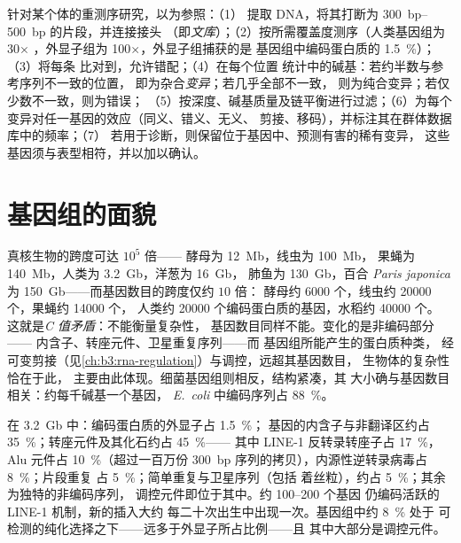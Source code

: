 \begin{method}[从样本到变异]\label{met:b3:genomics:pipeline}
针对某个体的重测序研究，以为参照：（1）
提取 DNA，将其打断为 \qtyrange{300}{500}{bp} 的片段，并连接接头
（即\emph{文库}）；（2）按所需覆盖度测序（人类基因组为 30$\times$
，外显子组为 100$\times$，外显子组捕获的是
基因组中编码蛋白质的 \qty{1.5}{\%}）；（3）将每条
比对到，允许错配；（4）在每个位置
统计中的碱基：若约半数与参考序列不一致的位置，
即为杂合\emph{变异}；若几乎全部不一致，
则为纯合变异；若仅少数不一致，则为错误；
（5）按深度、碱基质量及链平衡进行过滤；（6）为每个
变异对任一基因的效应（同义、错义、无义、
剪接、移码），并标注其在群体数据库中的频率；（7）
若用于诊断，则保留位于基因中、预测有害的稀有变异，
这些基因须与表型相符，并以加以确认。
\end{method}

\section{基因组的面貌}

\begin{proposition}[基因组大小与基因数目]\label{prop:b3:genomics:sizes}
真核生物的跨度可达 $10^{5}$ 倍——
酵母为 \qty{12}{Mb}，线虫为 \qty{100}{Mb}，
果蝇为 \qty{140}{Mb}，人类为 \qty{3.2}{Gb}，洋葱为 \qty{16}{Gb}，
肺鱼为 \qty{130}{Gb}，百合 \emph{Paris
japonica} 为 \qty{150}{Gb}——而基因数目的跨度仅约 $10$ 倍：
酵母约 \num{6000} 个，线虫约 \num{20000} 个，果蝇约 \num{14000} 个，
人类约 \num{20000} 个编码蛋白质的基因，水稻约 \num{40000} 个。
这就是\emph{C 值矛盾}：不能衡量复杂性，
基因数目同样不能。变化的是非编码部分——
内含子、转座元件、卫星重复序列——而
基因组所能产生的蛋白质种类，
经可变剪接（见\cref{ch:b3:rna-regulation}）与调控，远超其基因数目，
生物体的复杂性恰在于此，
主要由此体现。细菌基因组则相反，结构紧凑，其
大小确与基因数目相关：约每千碱基一个基因，
\emph{E.~coli} 中编码序列占 \qty{88}{\%}。
\end{proposition}

\begin{example}[按内容划分的人类基因组]\label{ex:b3:genomics:content}
在 \qty{3.2}{Gb} 中：编码蛋白质的外显子占 \qty{1.5}{\%}；
基因的内含子与非翻译区约占 \qty{35}{\%}；转座元件及其化石约占 \qty{45}{\%}——
其中 LINE-1 反转录转座子占 \qty{17}{\%}，
Alu 元件占 \qty{10}{\%}（超过一百万份
\qty{300}{bp} 序列的拷贝），内源性逆转录病毒占 \qty{8}{\%}；片段重复
占 \qty{5}{\%}；简单重复与卫星序列（包括
着丝粒），约占 \qty{5}{\%}；其余为独特的非编码序列，
调控元件即位于其中。约 \numrange{100}{200} 个基因
仍编码活跃的 LINE-1 机制，新的插入大约
每二十次出生中出现一次。基因组中约 \qty{8}{\%} 处于
可检测的纯化选择之下——远多于外显子所占比例——且
其中大部分是调控元件。
\end{example}

